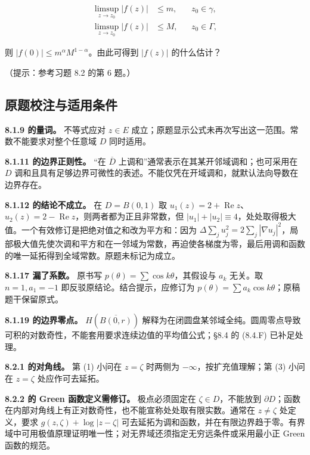 \documentclass[11pt,a4paper]{article}
\begin{document}
\[
\begin{aligned}
\limsup_{z\to z_0}|f(z)|&\le m,&&z_0\in\gamma,\\
\limsup_{z\to z_0}|f(z)|&\le M,&&z_0\in\Gamma,
\end{aligned}
\]

则 \(|f(0)|\le m^\alpha M^{1-\alpha}\)。由此可得到 \(|f(z)|\)
的什么估计？

（提示：参考习题 8.2 的第 6 题。）

\subsection{原题校注与适用条件}\label{ch08-practice-heading-6}

\textbf{8.1.9 的量词。} 不等式应对 \(z\in E\)
成立；原题显示公式未再次写出这一范围。常数不能要求对整个任意域 \(D\)
同时适用。

\textbf{8.1.11 的边界正则性。} ``在 \(\overline D\)
上调和''通常表示在其某开邻域调和；也可采用在 \(D\)
调和且具有足够边界可微性的表述。不能仅凭在开域调和，就默认法向导数在边界存在。

\textbf{8.1.12 的结论不成立。} 在 \(D=B(0,1)\) 取
\(u_1(z)=2+\operatorname{Re}z\)、\(u_2(z)=2-\operatorname{Re}z\)，则两者都为正且非常数，但
\(|u_1|+|u_2|\equiv4\)，处处取得极大值。一个有效修订是把绝对值之和改为平方和：因为
\(\Delta\sum_j u_j^2=2\sum_j|\nabla u_j|^2\)，局部极大值先使次调和平方和在一邻域为常数，再迫使各梯度为零，最后用调和函数的唯一延拓得到全域常数。原题未标记为成立。

\textbf{8.1.17 漏了系数。} 原书写
\(p(\theta)=\sum\cos k\theta\)，其假设与 \(a_k\) 无关。取 \(n=1,a_1=-1\)
即反驳原结论。结合提示，应修订为
\(p(\theta)=\sum a_k\cos k\theta\)；原稿题干保留原式。

\textbf{8.1.19 的边界零点。} \(H(\overline{B(0,r)})\)
解释为在闭圆盘某邻域全纯。圆周零点导致可积的对数奇性，不能套用要求连续边值的平均值公式；§8.4
的 (8.4.F) 已补足处理。

\textbf{8.2.1 的对角线。} 第 (1) 小问在 \(z=\zeta\) 时两侧为
\(-\infty\)，按扩充值理解；第 (3) 小问在 \(z=\zeta\) 处应作可去延拓。

\textbf{8.2.2 的 Green 函数定义需修订。} 极点必须固定在
\(\zeta\in D\)，不能放到
\(\partial D\)；函数在内部对角线上有正对数奇性，也不能宣称处处取有限实数。通常在
\(z\ne\zeta\) 处定义，要求 \(g(z,\zeta)+\log|z-\zeta|\)
可去延拓为调和函数，并在有限边界趋于零。有界域中可用极值原理证明唯一性；对无界域还须指定无穷远条件或采用最小正
Green 函数的规范。
\end{document}
